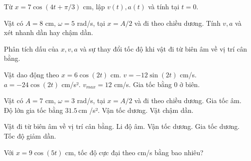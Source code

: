 \begin{ex}
Từ $x=7\cos(4t+\pi/3)$ cm, lập $v(t),a(t)$ và tính tại $t=0$.
\choiceTF

\end{ex}

\begin{ex}
Vật có $A=8$ cm, $\omega=5$ rad/s, tại $x=A/2$ và đi theo chiều dương. Tính $v,a$ và xét nhanh dần hay chậm dần.
\choiceTF

\end{ex}

\begin{ex}
Phân tích dấu của $x,v,a$ và sự thay đổi tốc độ khi vật đi từ biên âm về vị trí cân bằng.
\choiceTF

\end{ex}

\begin{ex}
Vật dao động theo $x=6\cos(2t)$ cm.
\choiceTF
{\True $v=-12\sin(2t)$ cm/s.}
{\True $a=-24\cos(2t)$ cm/s².}
{\True $v_{max}=12$ cm/s.}
{Gia tốc bằng 0 ở biên.}
\end{ex}

\begin{ex}
Vật có $A=7$ cm, $\omega=3$ rad/s, tại $x=A/2$ và đi theo chiều dương.
\choiceTF
{\True Gia tốc âm.}
{\True Độ lớn gia tốc bằng $31.5\,\text{cm}$ /s².}
{\True Vận tốc dương.}
{\True Vật chậm dần.}
\end{ex}

\begin{ex}
Vật đi từ biên âm về vị trí cân bằng.
\choiceTF
{\True Li độ âm.}
{\True Vận tốc dương.}
{\True Gia tốc dương.}
{Tốc độ giảm dần.}
\end{ex}

\begin{ex}
Với $x=9\cos(5t)$ cm, tốc độ cực đại theo cm/s bằng bao nhiêu?
\end{ex}


